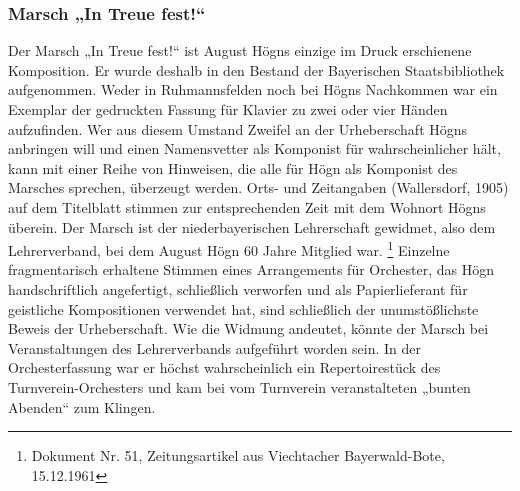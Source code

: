 \subsubsection{Marsch „In Treue fest!“}

 Der Marsch „In Treue fest!“ ist
August Högns einzige im Druck erschienene Komposition. Er wurde deshalb
in den Bestand der Bayerischen Staatsbibliothek aufgenommen. Weder in
Ruhmannsfelden noch bei Högns Nachkommen war ein Exemplar der
gedruckten Fassung für Klavier zu zwei oder vier Händen aufzufinden.
Wer aus diesem Umstand Zweifel an der Urheberschaft Högns anbringen
will und einen Namensvetter als Komponist für wahrscheinlicher hält,
kann mit einer Reihe von Hinweisen, die alle für Högn als Komponist des
Marsches sprechen, überzeugt werden. Orts- und Zeitangaben
(Wallersdorf, 1905) auf dem Titelblatt stimmen zur entsprechenden Zeit
mit dem Wohnort Högns überein. Der Marsch ist der niederbayerischen
Lehrerschaft gewidmet, also dem Lehrerverband, bei dem August Högn 60
Jahre Mitglied war. \footnote{Dokument Nr. 51, Zeitungsartikel aus
Viechtacher Bayerwald-Bote, 15.12.1961} Einzelne fragmentarisch
erhaltene Stimmen eines Arrangements für Orchester, das Högn
handschriftlich angefertigt, schließlich verworfen und als
Papierlieferant für geistliche Kompositionen verwendet hat, sind
schließlich der unumstößlichste Beweis der Urheberschaft. Wie die
Widmung andeutet, könnte der Marsch bei Veranstaltungen des
Lehrerverbands aufgeführt worden sein. In der Orchesterfassung war er
höchst wahrscheinlich ein Repertoirestück des Turnverein-Orchesters und
kam bei vom Turnverein veranstalteten „bunten Abenden“ zum Klingen.

